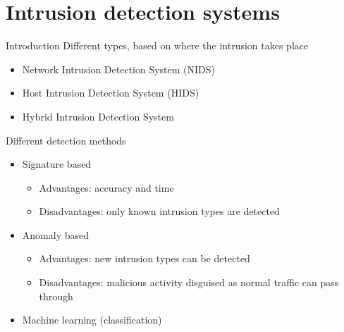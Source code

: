 \documentclass[11pt,t]{beamer}
\begin{document}
\section{Intrusion detection systems}
\begin{frame}{Introduction}
Different types, based on where the intrusion takes place
\begin{itemize}
    \item Network Intrusion Detection System (NIDS)
    \item Host Intrusion Detection System (HIDS)
    \item Hybrid Intrusion Detection System
\end{itemize}
\vfill
Different detection methods
\begin{itemize}
    \item Signature based
    \begin{itemize}
        \item Advantages: accuracy and time
        \item Disadvantages: only known intrusion types are detected
    \end{itemize}
    \item Anomaly based
    \begin{itemize}
        \item Advantages: new intrusion types can be detected
        \item Disadvantages: malicious activity disguised as normal traffic can pass through
    \end{itemize}
    \item Machine learning (classification)
\end{itemize}
\end{frame}
\end{document}

